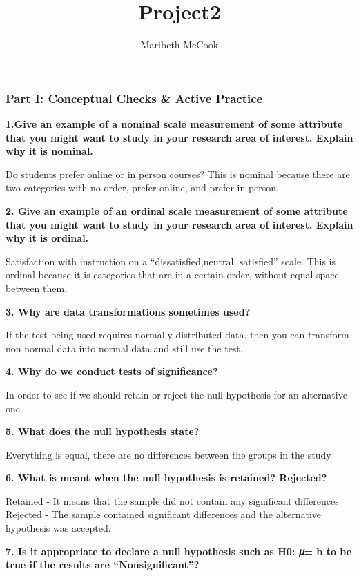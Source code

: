 \documentclass[
]{article}
\title{Project2}
\author{Maribeth McCook}
\date{}
\begin{document}
\maketitle

\hypertarget{part-i-conceptual-checks-active-practice}{%
\subsubsection{Part I: Conceptual Checks \& Active
Practice}\label{part-i-conceptual-checks-active-practice}}

\textbf{1.Give an example of a nominal scale measurement of some
attribute that you might want to study in your research area of
interest. Explain why it is nominal.}

Do students prefer online or in person courses? This is nominal because
there are two categories with no order, prefer online, and prefer
in-person.

\textbf{2. Give an example of an ordinal scale measurement of some
attribute that you might want to study in your research area of
interest. Explain why it is ordinal.}

Satisfaction with instruction on a ``dissatisfied,neutral, satisfied''
scale. This is ordinal because it is categories that are in a certain
order, without equal space between them.

\textbf{3. Why are data transformations sometimes used?}

If the test being used requires normally distributed data, then you can
transform non normal data into normal data and still use the test.

\textbf{4. Why do we conduct tests of significance?}

In order to see if we should retain or reject the null hypothesis for an
alternative one.

\textbf{5. What does the null hypothesis state?}

Everything is equal, there are no differences between the groups in the
study

\textbf{6. What is meant when the null hypothesis is retained?
Rejected?}

Retained - It means that the sample did not contain any significant
differences Rejected - The sample contained significant differences and
the alternative hypothesis was accepted.

\textbf{7. Is it appropriate to declare a null hypothesis such as H0: 𝜇=
b to be true if the results are ``Nonsignificant''?}
\end{document}
